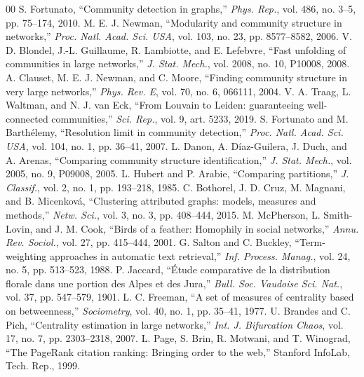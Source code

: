 \documentclass[conference]{IEEEtran}
\begin{document}
\begin{thebibliography}{00}
 S. Fortunato, ``Community detection in graphs,'' \emph{Phys. Rep.}, vol. 486, no. 3--5, pp. 75--174, 2010.
 M. E. J. Newman, ``Modularity and community structure in networks,'' \emph{Proc. Natl. Acad. Sci. USA}, vol. 103, no. 23, pp. 8577--8582, 2006.
 V. D. Blondel, J.-L. Guillaume, R. Lambiotte, and E. Lefebvre, ``Fast unfolding of communities in large networks,'' \emph{J. Stat. Mech.}, vol. 2008, no. 10, P10008, 2008.
 A. Clauset, M. E. J. Newman, and C. Moore, ``Finding community structure in very large networks,'' \emph{Phys. Rev. E}, vol. 70, no. 6, 066111, 2004.
 V. A. Traag, L. Waltman, and N. J. van Eck, ``From Louvain to Leiden: guaranteeing well-connected communities,'' \emph{Sci. Rep.}, vol. 9, art. 5233, 2019.
 S. Fortunato and M. Barth\'elemy, ``Resolution limit in community detection,'' \emph{Proc. Natl. Acad. Sci. USA}, vol. 104, no. 1, pp. 36--41, 2007.
 L. Danon, A. D\'iaz-Guilera, J. Duch, and A. Arenas, ``Comparing community structure identification,'' \emph{J. Stat. Mech.}, vol. 2005, no. 9, P09008, 2005.
 L. Hubert and P. Arabie, ``Comparing partitions,'' \emph{J. Classif.}, vol. 2, no. 1, pp. 193--218, 1985.
 C. Bothorel, J. D. Cruz, M. Magnani, and B. Micenkov\'a, ``Clustering attributed graphs: models, measures and methods,'' \emph{Netw. Sci.}, vol. 3, no. 3, pp. 408--444, 2015.
 M. McPherson, L. Smith-Lovin, and J. M. Cook, ``Birds of a feather: Homophily in social networks,'' \emph{Annu. Rev. Sociol.}, vol. 27, pp. 415--444, 2001.
 G. Salton and C. Buckley, ``Term-weighting approaches in automatic text retrieval,'' \emph{Inf. Process. Manag.}, vol. 24, no. 5, pp. 513--523, 1988.
 P. Jaccard, ``\'Etude comparative de la distribution florale dans une portion des Alpes et des Jura,'' \emph{Bull. Soc. Vaudoise Sci. Nat.}, vol. 37, pp. 547--579, 1901.
 L. C. Freeman, ``A set of measures of centrality based on betweenness,'' \emph{Sociometry}, vol. 40, no. 1, pp. 35--41, 1977.
 U. Brandes and C. Pich, ``Centrality estimation in large networks,'' \emph{Int. J. Bifurcation Chaos}, vol. 17, no. 7, pp. 2303--2318, 2007.
 L. Page, S. Brin, R. Motwani, and T. Winograd, ``The PageRank citation ranking: Bringing order to the web,'' Stanford InfoLab, Tech. Rep., 1999.

\end{thebibliography}
\end{document}
